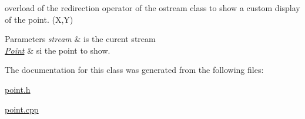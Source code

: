 overload of the redirection operator of the ostream class to show a custom display of the point. (X,Y) 


\begin{DoxyParams}{Parameters}
{\em stream} & is the curent stream \\
\hline
{\em \hyperlink{class_point}{Point}} & si the point to show. \\
\hline
\end{DoxyParams}


The documentation for this class was generated from the following files\+:\begin{DoxyCompactItemize}
\item 
\hyperlink{point_8h}{point.\+h}\item 
\hyperlink{point_8cpp}{point.\+cpp}\end{DoxyCompactItemize}
